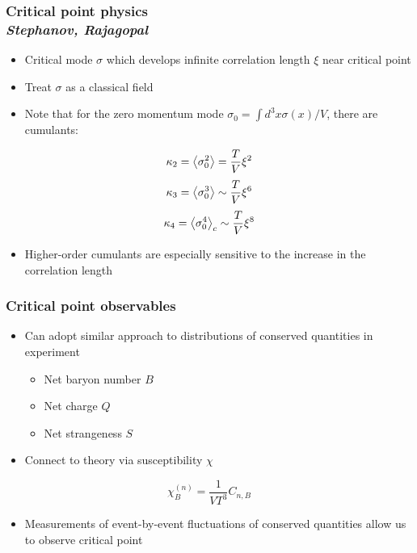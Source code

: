 \documentclass[accentcolor=tud2c,usenames,dvipsnames,colorbacktitle,inverttitle,landscape,german,presentation,t]{tudbeamer}
\begin{document}
  \begin{frame}
    \frametitle{Critical point physics \\ \small{\textit{Stephanov,
    Rajagopal}}}
    \begin{itemize}
      \item Critical mode $\sigma$ which develops infinite correlation length
        $\xi$ near critical point
      \item Treat $\sigma$ as a classical field
      \item Note that for the zero momentum mode $\sigma_0 = \int d^3x
        \sigma(x)/V$, there are cumulants:
    \end{itemize}
    \begin{equation*}
      \kappa_2 = \expectationvalue{\sigma_{0}^{2}} = \frac{T}{V} \xi^2
    \end{equation*}
    \begin{equation*}
      \kappa_3 = \expectationvalue{\sigma_{0}^{3}} \sim \frac{T}{V} \xi^6
    \end{equation*}
    \begin{equation*}
      \kappa_4 = \expectationvalue{\sigma_{0}^{4}}_c \sim \frac{T}{V} \xi^8
    \end{equation*}
    \begin{itemize}
      \item Higher-order cumulants are especially sensitive to the increase in
        the correlation length
      \end{itemize}
  \end{frame}

  \begin{frame}
    \frametitle{Critical point observables}
    \begin{itemize}
      \item Can adopt similar approach to distributions of conserved quantities
        in experiment
      \begin{itemize}
        \item Net baryon number $B$
        \item Net charge $Q$
        \item Net strangeness $S$
      \end{itemize}
      \item Connect to theory via susceptibility $\chi$
    \end{itemize}
    \begin{equation*}
      \chi_{B}^{(n)} = \frac{1}{V T^3} C_{n,B}
    \end{equation*}
    \begin{itemize}
      \item Measurements of event-by-event fluctuations of conserved quantities allow
        us to observe critical point
    \end{itemize}
  \end{frame}
\end{document}
